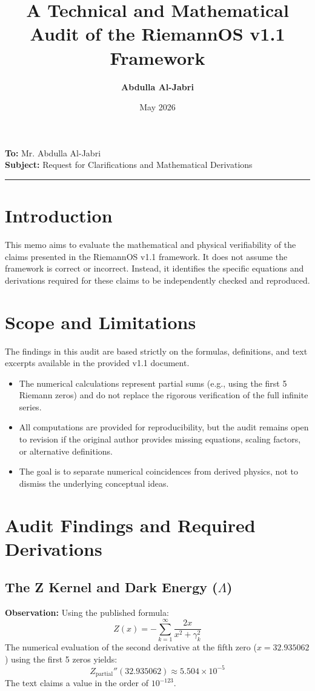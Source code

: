 \documentclass[11pt,a4paper]{article}
\title{\textbf{A Technical and Mathematical Audit of the RiemannOS v1.1 Framework}}
\author{\textbf{Abdulla Al-Jabri}}
\date{May 2026}
\begin{document}
\maketitle
\thispagestyle{fancy}

\noindent \textbf{To:} Mr. Abdulla Al-Jabri \\
\textbf{Subject:} Request for Clarifications and Mathematical Derivations

\vspace{0.5cm}
\hrule
\vspace{0.5cm}

\section{Introduction}
This memo aims to evaluate the mathematical and physical verifiability of the claims presented in the RiemannOS v1.1 framework. It does not assume the framework is correct or incorrect. Instead, it identifies the specific equations and derivations required for these claims to be independently checked and reproduced.

\section{Scope and Limitations}
The findings in this audit are based strictly on the formulas, definitions, and text excerpts available in the provided v1.1 document.
\begin{itemize}
    \item The numerical calculations represent partial sums (e.g., using the first 5 Riemann zeros) and do not replace the rigorous verification of the full infinite series.
    \item All computations are provided for reproducibility, but the audit remains open to revision if the original author provides missing equations, scaling factors, or alternative definitions.
    \item The goal is to separate numerical coincidences from derived physics, not to dismiss the underlying conceptual ideas.
\end{itemize}

\section{Audit Findings and Required Derivations}

\subsection{The Z Kernel and Dark Energy ($\Lambda$)}
\textbf{Observation:} Using the published formula:
\[
    Z(x) = -\sum_{k=1}^{\infty} \frac{2x}{x^2+\gamma_k^2}
\]
The numerical evaluation of the second derivative at the fifth zero ($x = 32.935062$) using the first 5 zeros yields:
\[
    Z_{\text{partial}}''(32.935062) \approx 5.504 \times 10^{-5}
\]
The text claims a value in the order of $10^{-123}$.
\end{document}
